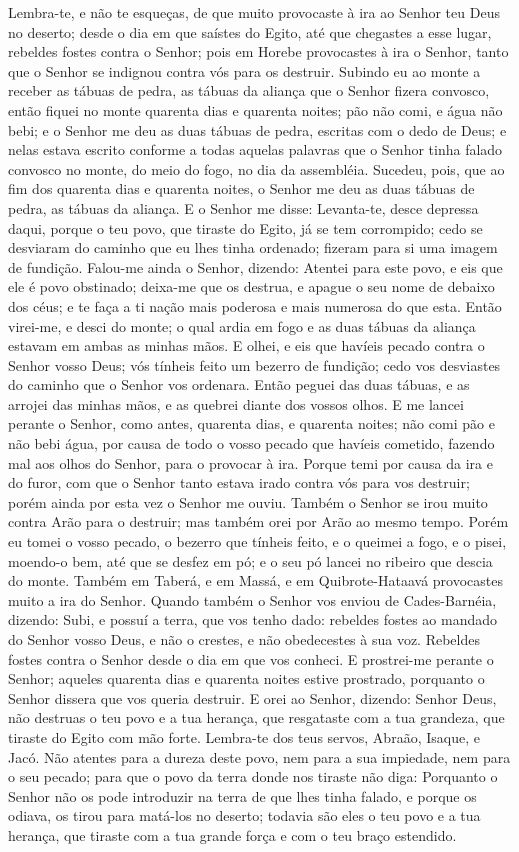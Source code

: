 Lembra-te, e não te esqueças, de que muito provocaste à ira ao
Senhor teu Deus no deserto; desde o dia em que saístes do Egito, até
que chegastes a esse lugar, rebeldes fostes contra o Senhor;
pois em Horebe provocastes à ira o Senhor, tanto que o Senhor se
indignou contra vós para os destruir. Subindo eu ao monte a
receber as tábuas de pedra, as tábuas da aliança que o Senhor fizera
convosco, então fiquei no monte quarenta dias e quarenta noites; pão
não comi, e água não bebi; e o Senhor me deu as duas tábuas
de pedra, escritas com o dedo de Deus; e nelas estava escrito
conforme a todas aquelas palavras que o Senhor tinha falado convosco
no monte, do meio do fogo, no dia da assembléia. Sucedeu,
pois, que ao fim dos quarenta dias e quarenta noites, o Senhor me
deu as duas tábuas de pedra, as tábuas da aliança. E o Senhor
me disse: Levanta-te, desce depressa daqui, porque o teu povo, que
tiraste do Egito, já se tem corrompido; cedo se desviaram do caminho
que eu lhes tinha ordenado; fizeram para si uma imagem de fundição.
Falou-me ainda o Senhor, dizendo: Atentei para este povo, e
eis que ele é povo obstinado; deixa-me que os destrua, e
apague o seu nome de debaixo dos céus; e te faça a ti nação mais
poderosa e mais numerosa do que esta. Então virei-me, e desci
do monte; o qual ardia em fogo e as duas tábuas da aliança estavam
em ambas as minhas mãos. E olhei, e eis que havíeis pecado
contra o Senhor vosso Deus; vós tínheis feito um bezerro de
fundição; cedo vos desviastes do caminho que o Senhor vos ordenara.
Então peguei das duas tábuas, e as arrojei das minhas mãos, e
as quebrei diante dos vossos olhos. E me lancei perante o
Senhor, como antes, quarenta dias, e quarenta noites; não comi pão e
não bebi água, por causa de todo o vosso pecado que havíeis
cometido, fazendo mal aos olhos do Senhor, para o provocar à ira.
Porque temi por causa da ira e do furor, com que o Senhor
tanto estava irado contra vós para vos destruir; porém ainda por
esta vez o Senhor me ouviu. Também o Senhor se irou muito
contra Arão para o destruir; mas também orei por Arão ao mesmo
tempo. Porém eu tomei o vosso pecado, o bezerro que tínheis
feito, e o queimei a fogo, e o pisei, moendo-o bem, até que se
desfez em pó; e o seu pó lancei no ribeiro que descia do monte.
Também em Taberá, e em Massá, e em Quibrote-Hataavá
provocastes muito a ira do Senhor. Quando também o Senhor vos
enviou de Cades-Barnéia, dizendo: Subi, e possuí a terra, que vos
tenho dado: rebeldes fostes ao mandado do Senhor vosso Deus, e não o
crestes, e não obedecestes à sua voz. Rebeldes fostes contra
o Senhor desde o dia em que vos conheci. E prostrei-me
perante o Senhor; aqueles quarenta dias e quarenta noites estive
prostrado, porquanto o Senhor dissera que vos queria destruir.
E orei ao Senhor, dizendo: Senhor Deus, não destruas o teu
povo e a tua herança, que resgataste com a tua grandeza, que tiraste
do Egito com mão forte. Lembra-te dos teus servos, Abraão,
Isaque, e Jacó. Não atentes para a dureza deste povo, nem para a sua
impiedade, nem para o seu pecado; para que o povo da terra
donde nos tiraste não diga: Porquanto o Senhor não os pode
introduzir na terra de que lhes tinha falado, e porque os odiava, os
tirou para matá-los no deserto; todavia são eles o teu povo e
a tua herança, que tiraste com a tua grande força e com o teu braço
estendido.

